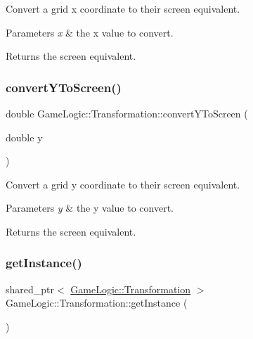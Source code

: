 Convert a grid x coordinate to their screen equivalent. 
\begin{DoxyParams}{Parameters}
{\em x} & the x value to convert. \\
\hline
\end{DoxyParams}
\begin{DoxyReturn}{Returns}
the screen equivalent. 
\end{DoxyReturn}
\mbox{\label{classGameLogic_1_1Transformation_a6a3d8fd76997ed12fc6dc9640118f405}} 
\subsubsection{\texorpdfstring{convert\+Y\+To\+Screen()}{convertYToScreen()}}
{\footnotesize\ttfamily double Game\+Logic\+::\+Transformation\+::convert\+Y\+To\+Screen (\begin{DoxyParamCaption}\item[{double}]{y }\end{DoxyParamCaption})}

Convert a grid y coordinate to their screen equivalent. 
\begin{DoxyParams}{Parameters}
{\em y} & the y value to convert. \\
\hline
\end{DoxyParams}
\begin{DoxyReturn}{Returns}
the screen equivalent. 
\end{DoxyReturn}
\mbox{\label{classGameLogic_1_1Transformation_a1b76a508913396581f4eeed63e96776d}} 
\subsubsection{\texorpdfstring{get\+Instance()}{getInstance()}}
{\footnotesize\ttfamily shared\+\_\+ptr$<$ \hyperlink{classGameLogic_1_1Transformation}{Game\+Logic\+::\+Transformation} $>$ Game\+Logic\+::\+Transformation\+::get\+Instance (\begin{DoxyParamCaption}{ }\end{DoxyParamCaption})\hspace{0.3cm}{\ttfamily [static]}}

